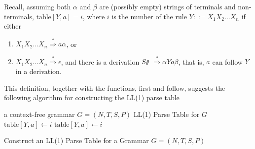 \documentclass[8pt,a4paper,compress]{beamer}
\newcommand{\derives}{\stackrel{*}{\Rightarrow}}
\begin{document}
\begin{frame}[fragile]
\pause

Recall, assuming both $\alpha$ and $\beta$ are (possibly empty) strings of terminals and non-terminals, $\text{table}[Y, a] = i$, where $i$ is the number of the rule $Y ::= X_1X_2 \dots X_n$ if either

\begin{enumerate}
\item $X_1X_2 \dots X_n \derives a\alpha$, or
\item $X_1X_2 \dots X_n \derives \epsilon$, and there is a derivation $S$\lstinline{#} $\derives \alpha Ya\beta$, that is, $a$ can follow $Y$ in a derivation.
\end{enumerate}

This definition, together with the functions, first and follow, suggests the following algorithm for constructing the LL(1) parse table

\begin{algorithm}[H]
\begin{algorithmic}
\REQUIRE a context-free grammar $G=(N,T,S,P)$
\ENSURE LL(1) Parse Table for $G$
\STATE $\text{table}[Y, a] \gets i$
\STATE $\text{table}[Y, a] \gets i$
\ENDFOR
\ENDIF
\ENDFOR
\ENDFOR
\ENDFOR
\end{algorithmic}
\caption{Construct an LL(1) Parse Table for a Grammar $G=(N,T,S,P)$}
\end{algorithm}
\end{frame}
\end{document}

